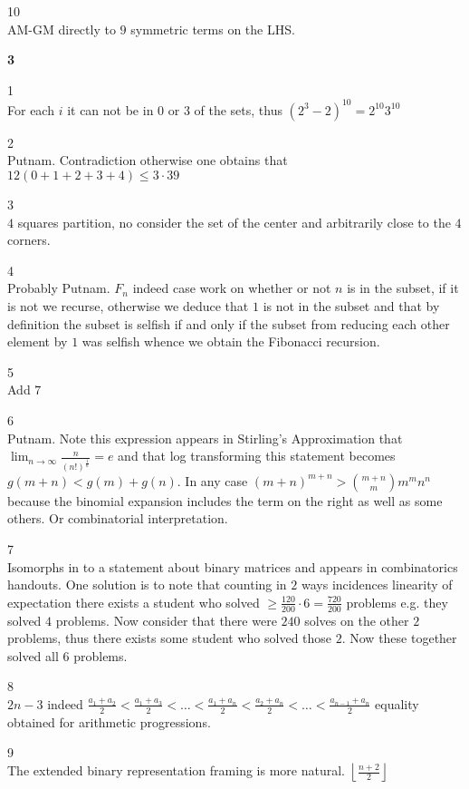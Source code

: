 10 \\
AM-GM directly to $9$ symmetric terms on the LHS.

\newpage

\textbf{3}

1 \\
For each $i$ it can not be in $0$ or $3$ of the sets, thus $(2^3-2)^{10}=\boxed{2^{10} 3^{10}}$

2 \\
Putnam. Contradiction otherwise one obtains that $12(0+1+2+3+4) \le 3 \cdot 39$

3 \\
$4$ squares partition, $\boxed{\text{no}}$ consider the set of the center and arbitrarily close to the $4$ corners.

4 \\
Probably Putnam. $\boxed{F_n}$ indeed case work on whether or not $n$ is in the subset, if it is not we recurse, otherwise we deduce that $1$ is not in the subset and that by definition the subset is selfish if and only if the subset from reducing each other element by $1$ was selfish whence we obtain the Fibonacci recursion.

5 \\
Add $\boxed{7}$

6 \\
Putnam. Note this expression appears in Stirling's Approximation that $\lim_{n \to \infty} \frac{n}{(n!)^{\frac{1}{n}}} = e$ and that log transforming this statement becomes $g(m+n)<g(m)+g(n)$. In any case $(m+n)^{m+n} > \binom{m+n}{m} m^m n^n$ because the binomial expansion includes the term on the right as well as some others. Or combinatorial interpretation.

7 \\
Isomorphs in to a statement about binary matrices and appears in combinatorics handouts. One solution is to note that counting in $2$ ways incidences linearity of expectation there exists a student who solved $\ge \frac{120}{200} \cdot 6=\frac{720}{200}$ problems e.g. they solved $4$ problems. Now consider that there were $240$ solves on the other $2$ problems, thus there exists some student who solved those $2$. Now these together solved all $6$ problems.

8 \\
$\boxed{2n-3}$ indeed $\frac{a_1+a_2}{2} < \frac{a_1+a_3}{2} < \dots < \frac{a_1+a_n}{2} < \frac{a_2+a_n}{2} < \dots < \frac{a_{n-1}+a_n}{2}$ equality obtained for arithmetic progressions.

9 \\
The extended binary representation framing is more natural. $\boxed{\left \lfloor \frac{n+2}{2} \right \rfloor}$

